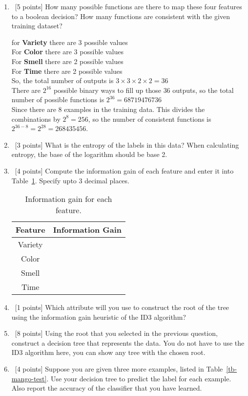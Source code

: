 \begin{enumerate}
  \begin{enumerate}
  \item~[5 points] How many possible functions are there to map these four features to a boolean decision? How many functions are consistent with the given training dataset?

  {\color{red}
  for \textbf{Variety} there are 3 possible values \\
  For \textbf{Color} there are 3 possible values \\
  For \textbf{Smell} there are 2 possible values \\
  For \textbf{Time} there are 2 possible values \\
  So, the total number of outputs is $3 \times 3 \times 2 \times 2 = 36$ \\
  There are $2^16$ possible binary ways to fill up those $36$ outputs, so the total number of possible functions is $2^{36} = 68719476736$ \\
  Since there are 8 examples in the training data. This divides the combinations by $2^8 = 256$, so the number of consistent functions is $2^{36 - 8} = 2^{28} = 268435456$.
  }

  \item~[3 points] What is the entropy of the labels in this data? When calculating entropy, the base of the logarithm should be base 2.
  \item~[4 points] Compute the information gain of each feature and enter it
    into Table~\ref{tb-entropy-ig}. Specify upto 3 decimal places.
    \begin{table}[h]
      \centering
      \begin{tabular}{c|c}

        \hline
        Feature & Information Gain \\ \hline
        Variety &                  \\
        Color   &                  \\
        Smell   &                  \\
        Time    &                  \\ \hline
      \end{tabular}
      \caption{Information gain for each feature.}
      \label{tb-entropy-ig}
    \end{table}
  \item~[1 points] Which attribute will you use to construct the root of the
    tree using the information gain heuristic of the ID3 algorithm?
  \item~[8 points] Using the root that you selected in the previous question,
    construct a decision tree that represents the data. You do not have to use
    the ID3 algorithm here, you can show any tree with the chosen root.
  \item~[4 points] Suppose you are given three more examples, listed in
    Table~\ref{tb-mango-test}. Use your decision tree to predict the label for
    each example. Also report the accuracy of the classifier that you have
    learned.
  \end{enumerate}


\end{enumerate}

